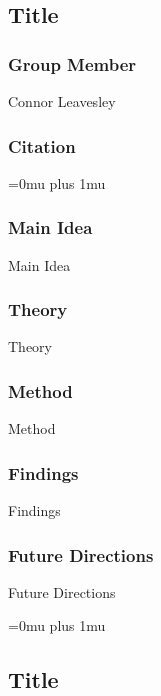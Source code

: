 \noindent
\subsection{Title}

\subsubsection{Group Member}

\noindent
Connor Leavesley

\noindent
\subsubsection{Citation}

\Urlmuskip=0mu plus 1mu\relax

\subsubsection{Main Idea}

\noindent
Main Idea

\subsubsection{Theory}

\noindent
Theory

\subsubsection{Method}

\noindent
Method

\subsubsection{Findings}

\noindent
Findings

\subsubsection{Future Directions}

\noindent
Future Directions 

\Urlmuskip=0mu plus 1mu\relax

\noindent
\subsection{Title}

